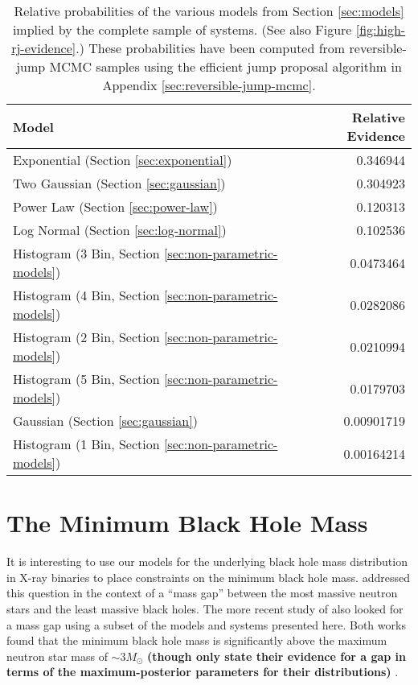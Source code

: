 \documentclass[preprint]{aastex}
\newcommand{\Msun}{M_\odot}
\newcommand{\changed}[1]{{\bf #1 }}
\begin{document}
\begin{table}
  \begin{center}
    \begin{tabular}{|l|r|}
      \hline
      Model & Relative Evidence \\
      \hline \hline
      Exponential (Section \ref{sec:exponential}) & 0.346944 \\
      \hline
      Two Gaussian (Section \ref{sec:gaussian}) & 0.304923 \\
      \hline
      Power Law (Section \ref{sec:power-law}) & 0.120313 \\
      \hline
      Log Normal (Section \ref{sec:log-normal}) & 0.102536 \\
      \hline
      Histogram (3 Bin, Section \ref{sec:non-parametric-models}) &
      0.0473464 \\
      \hline
      Histogram (4 Bin, Section \ref{sec:non-parametric-models}) &
      0.0282086 \\
      \hline 
      Histogram (2 Bin, Section \ref{sec:non-parametric-models}) &
      0.0210994 \\
      \hline 
      Histogram (5 Bin, Section \ref{sec:non-parametric-models}) &
      0.0179703  \\
      \hline      
      Gaussian (Section \ref{sec:gaussian}) & 0.00901719 \\ 
      \hline
      Histogram (1 Bin, Section \ref{sec:non-parametric-models}) &
      0.00164214 \\
      \hline
    \end{tabular}
  \end{center}
  \caption{\label{tab:rj-high} Relative probabilities of the various models
    from Section \ref{sec:models} implied by the complete sample of systems.  (See also Figure \ref{fig:high-rj-evidence}.)  These probabilities have been 
    computed from reversible-jump MCMC samples using the efficient jump proposal algorithm in Appendix \ref{sec:reversible-jump-mcmc}.}
\end{table}


\section{The Minimum Black Hole Mass}
\label{sec:minimum-mass}

It is interesting to use our models for the underlying black hole mass
distribution in X-ray binaries to place constraints on the minimum
black hole mass.  \citet{Bailyn1998} addressed this question in the
context of a ``mass gap'' between the most massive neutron stars and
the least massive black holes.  The more recent study of
\citet{Ozel2010} also looked for a mass gap using a subset of the
models and systems presented here.  Both works found that the minimum
black hole mass is significantly above the maximum neutron star mass
\citep{Kalogera1996} of $\sim 3 \Msun$ \changed{(though
  \citet{Ozel2010} only state their evidence for a gap in terms of the
  maximum-posterior parameters for their distributions)}.
\end{document}
